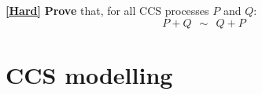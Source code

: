 \documentclass[11pt]{article}
\begin{document}
\begin{myExercise}
  \underline{\textbf{[Hard]}} \textbf{Prove} that, for all CCS processes $P$ and $Q$: $$P+Q ~~\sim~~ Q+P$$ 
\end{myExercise}


\section*{CCS modelling}

\end{document}
